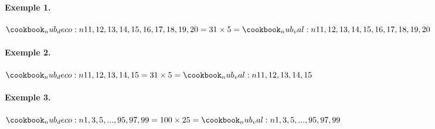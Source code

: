 \documentclass[border=3pt]{standalone}
\begin{document}
\begin{minipage}{12cm}

\paragraph{Exemple 1.}

$ \nub{11, 12, 13, 14, 15, 16, 17, 18, 19, 20}%
= 31 \times 5 %
= \nub*{11, 12, 13, 14, 15, 16, 17, 18, 19, 20}$

\paragraph{Exemple 2.}

$\nub{11, 12, 13, 14, 15}%
= 31 \times 5 %
= \nub*{11, 12, 13, 14, 15}$

\paragraph{Exemple 3.}

$ \nub{1, 3, 5,..., 95, 97, 99}%
= 100 \times 25%
= \nub*{1, 3, 5,..., 95, 97, 99}$

\end{minipage}
\end{document}
